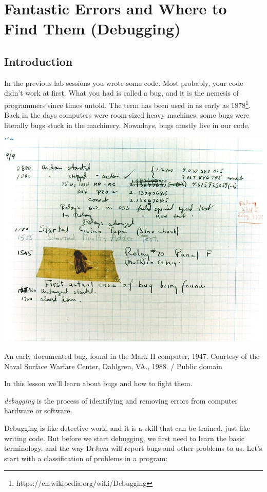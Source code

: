 \chapter{Fantastic Errors and Where to Find Them (Debugging)}

\section{Introduction}

In the previous lab sessions you wrote some code. Most probably, your code didn't work at first. What you had is called a bug, and it is the nemesis of programmers since times untold. The term has been used in as early as $1878$\footnote{https://en.wikipedia.org/wiki/Debugging}. Back in the days computers were room-sized heavy machines, some bugs were literally bugs stuck in the machinery. Nowadays, bugs mostly live in our code.

\begin{marginfigure}
\centering
\includegraphics[width=.9\linewidth]{images/bug.jpg}
\caption{An early documented bug, found in the Mark II computer, 1947. Courtesy of the Naval Surface Warfare Center, Dahlgren, VA., 1988. / Public domain}
\end{marginfigure}

In this lesson we'll learn about bugs and how to fight them. 

\begin{definition}
\emph{debugging} is the process of identifying and removing errors from computer hardware or software.
\end{definition}

Debugging is like detective work, and it is a skill that can be trained, just like writing code. But before we start debugging, we first need to learn the basic terminology, and the way DrJava will report bugs and other problems to us. Let's start with a classification of problems in a program:

